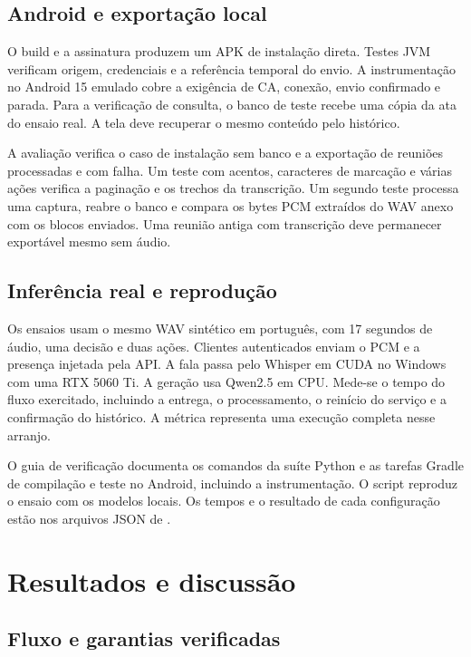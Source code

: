 \documentclass[12pt]{article}
\newcommand{\docpath}[1]{\path{#1}}
\begin{document}
\subsection{Android e exportação local}

O build e a assinatura produzem um APK de instalação direta. Testes JVM verificam origem, credenciais e a referência temporal do envio. A instrumentação no Android 15 emulado cobre a exigência de CA, conexão, envio confirmado e parada. Para a verificação de consulta, o banco de teste recebe uma cópia da ata do ensaio real. A tela deve recuperar o mesmo conteúdo pelo histórico.

A avaliação verifica o caso de instalação sem banco e a exportação de reuniões processadas e com falha. Um teste com acentos, caracteres de marcação e várias ações verifica a paginação e os trechos da transcrição. Um segundo teste processa uma captura, reabre o banco e compara os bytes PCM extraídos do WAV anexo com os blocos enviados. Uma reunião antiga com transcrição deve permanecer exportável mesmo sem áudio.

\subsection{Inferência real e reprodução}

Os ensaios usam o mesmo WAV sintético em português, com 17 segundos de áudio, uma decisão e duas ações. Clientes autenticados enviam o PCM e a presença injetada pela API. A fala passa pelo Whisper em CUDA no Windows com uma RTX 5060 Ti. A geração usa Qwen2.5 em CPU. Mede-se o tempo do fluxo exercitado, incluindo a entrega, o processamento, o reinício do serviço e a confirmação do histórico. A métrica representa uma execução completa nesse arranjo.

O guia de verificação documenta os comandos da suíte Python e as tarefas Gradle de compilação e teste no Android, incluindo a instrumentação. O script \docpath{ensaio.py} reproduz o ensaio com os modelos locais. Os tempos e o resultado de cada configuração estão nos arquivos JSON de \docpath{marco-4/docs/evidencias}.

\section{Resultados e discussão}
\label{sec:resultados}

\subsection{Fluxo e garantias verificadas}
\end{document}
